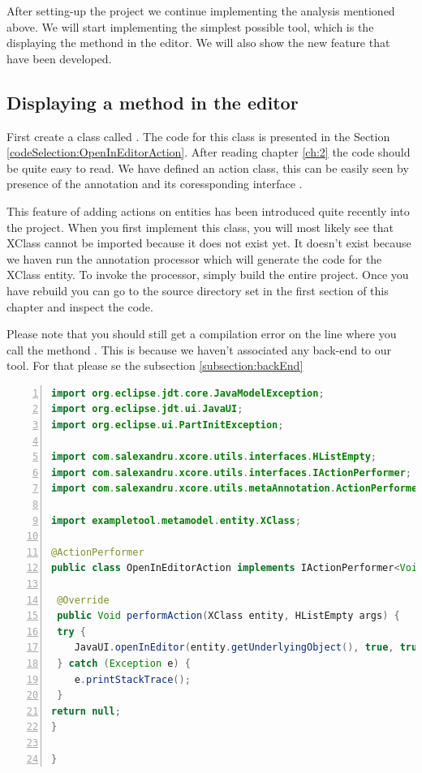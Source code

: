         After setting-up the project we continue implementing the analysis mentioned above. We will start implementing the simplest possible tool, which is the displaying the methond in the editor.
        We will also show the new feature that have been developed.

\subsection{Displaying a method in the editor}
       
        First create a class called . The code for this class is presented in the Section \ref{codeSelection:OpenInEditorAction}.
After reading chapter \ref{ch:2} the code should be quite easy to read. We have defined an action class, this can be easily seen by presence of the annotation
 and its coressponding interface . 
       
        This feature of adding actions on entities has been introduced quite recently into the project. 
        When you first implement this class, you will most likely see that XClass cannot be imported because it does not exist yet.  It doesn't exist because we haven run the annotation processor 
which will generate the code for the XClass entity. To invoke the processor, simply build the entire project. Once you have rebuild you can go to the source directory set in the first section of
this chapter and inspect the code. 

        Please note that you should still get a compilation error on the line where you call the methond . This is because we haven't associated any back-end to our tool.
For that please se the subsection \ref{subsection:backEnd}

\small
\begin{lstlisting}[language=Java,numbers=left]
import org.eclipse.jdt.core.JavaModelException;
import org.eclipse.jdt.ui.JavaUI;
import org.eclipse.ui.PartInitException;

import com.salexandru.xcore.utils.interfaces.HListEmpty;
import com.salexandru.xcore.utils.interfaces.IActionPerformer;
import com.salexandru.xcore.utils.metaAnnotation.ActionPerformer;

import exampletool.metamodel.entity.XClass;

@ActionPerformer
public class OpenInEditorAction implements IActionPerformer<Void, XClass, HListEmpty> {

 @Override
 public Void performAction(XClass entity, HListEmpty args) {
 try {
    JavaUI.openInEditor(entity.getUnderlyingObject(), true, true);
 } catch (Exception e) {
    e.printStackTrace();
 }
return null;
}

}
\end{lstlisting}
\normalsize{}\label{codeSelection:OpenInEditorAction}

